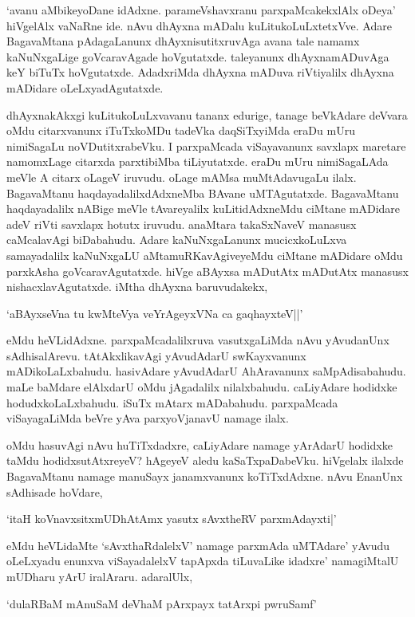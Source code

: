 `avanu aMbikeyoDane idAdxne. parameVshavxranu parxpaMcakekxlAlx oDeya' hiVgelAlx vaNaRne ide. nAvu dhAyxna mADalu kuLitukoLuLxtetxVve. Adare BagavaMtana pAdagaLanunx dhAyxnisutitxruvAga avana tale namamx kaNuNxgaLige goVcaravAgade hoVgutatxde. taleyanunx dhAyxnamADuvAga keY biTuTx hoVgutatxde. AdadxriMda dhAyxna mADuva riVtiyalilx dhAyxna mADidare oLeLxyadAgutatxde.

dhAyxnakAkxgi kuLitukoLuLxvavanu tananx edurige, tanage beVkAdare deVvara oMdu citarxvanunx iTuTxkoMDu tadeVka daqSiTxyiMda eraDu mUru nimiSagaLu noVDutitxrabeVku. I parxpaMcada viSayavanunx savxlapx maretare namomxLage citarxda parxtibiMba tiLiyutatxde. eraDu mUru nimiSagaLAda meVle A citarx oLageV iruvudu. oLage mAMsa muMtAdavugaLu ilalx. BagavaMtanu haqdayadalilxdAdxneMba BAvane uMTAgutatxde. BagavaMtanu haqdayadalilx nABige meVle tAvareyalilx kuLitidAdxneMdu ciMtane mADidare adeV riVti savxlapx hotutx iruvudu. anaMtara takaSxNaveV manasusx caMcalavAgi biDabahudu. Adare kaNuNxgaLanunx mucicxkoLuLxva samayadalilx kaNuNxgaLU aMtamuRKavAgiveyeMdu ciMtane mADidare oMdu parxkAsha goVcaravAgutatxde. hiVge aBAyxsa mADutAtx mADutAtx manasusx nishacxlavAgutatxde. iMtha dhAyxna baruvudakekx,

\begin{shloka}
`aBAyxseVna tu kwMteVya veYrAgeyxVNa ca gaqhayxteV||'
\end{shloka} 

eMdu heVLidAdxne. parxpaMcadalilxruva vasutxgaLiMda nAvu yAvudanUnx sAdhisalArevu. tAtAkxlikavAgi yAvudAdarU swKayxvanunx mADikoLaLxbahudu. hasivAdare yAvudAdarU AhAravanunx saMpAdisabahudu. maLe baMdare elAlxdarU oMdu jAgadalilx nilalxbahudu. caLiyAdare hodidxke hodudxkoLaLxbahudu. iSuTx mAtarx mADabahudu. parxpaMcada viSayagaLiMda beVre yAva parxyoVjanavU namage ilalx.

oMdu hasuvAgi nAvu huTiTxdadxre, caLiyAdare namage yArAdarU hodidxke taMdu hodidxsutAtxreyeV? hAgeyeV aledu kaSaTxpaDabeVku. hiVgelalx ilalxde BagavaMtanu namage manuSayx janamxvanunx koTiTxdAdxne. nAvu EnanUnx sAdhisade hoVdare,

\begin{shloka}
`itaH koVnavxsitxmUDhAtAmx yasutx sAvxtheRV parxmAdayxti|'
\end{shloka} 

eMdu heVLidaMte `sAvxthaRdalelxV' namage parxmAda uMTAdare' yAvudu oLeLxyadu enunxva viSayadalelxV tapApxda tiLuvaLike idadxre' namagiMtalU mUDharu yArU iralAraru. adaralUlx,

\begin{shloka}
`dulaRBaM mAnuSaM deVhaM pArxpayx tatArxpi pwruSamf'
\end{shloka}

